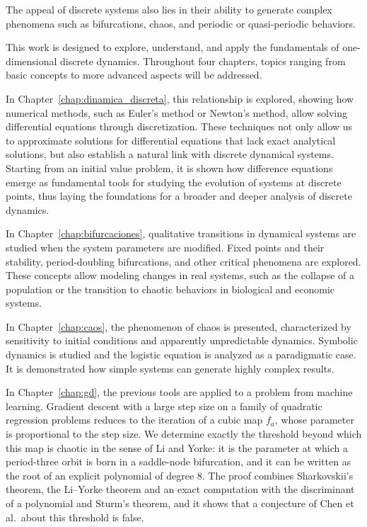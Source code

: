 \documentclass[12pt,a4paper]{report}
\theoremstyle{definition}
\begin{document}
The appeal of discrete systems also lies in their ability to generate complex phenomena such as bifurcations, chaos, and periodic or quasi-periodic behaviors.

This work is designed to explore, understand, and apply the fundamentals of one-dimensional discrete dynamics. Throughout four chapters, topics ranging from basic concepts to more advanced aspects will be addressed.

In Chapter~\ref{chap:dinamica_discreta}, this relationship is explored, showing how numerical methods, such as Euler's method or Newton's method, allow solving differential equations through discretization. These techniques not only allow us to approximate solutions for differential equations that lack exact analytical solutions, but also establish a natural link with discrete dynamical systems. Starting from an initial value problem, it is shown how difference equations emerge as fundamental tools for studying the evolution of systems at discrete points, thus laying the foundations for a broader and deeper analysis of discrete dynamics.

In Chapter~\ref{chap:bifurcaciones}, qualitative transitions in dynamical systems are studied when the system parameters are modified. Fixed points and their stability, period-doubling bifurcations, and other critical phenomena are explored. These concepts allow modeling changes in real systems, such as the collapse of a population or the transition to chaotic behaviors in biological and economic systems.

In Chapter~\ref{chap:caos}, the phenomenon of chaos is presented, characterized by sensitivity to initial conditions and apparently unpredictable dynamics. Symbolic dynamics is studied and the logistic equation is analyzed as a paradigmatic case. It is demonstrated how simple systems can generate highly complex results.

In Chapter~\ref{chap:gd}, the previous tools are applied to a problem from machine learning. Gradient descent with a large step size on a family of quadratic regression problems reduces to the iteration of a cubic map $f_a$, whose parameter is proportional to the step size. We determine exactly the threshold beyond which this map is chaotic in the sense of Li and Yorke: it is the parameter at which a period-three orbit is born in a saddle-node bifurcation, and it can be written as the root of an explicit polynomial of degree $8$. The proof combines Sharkovskii's theorem, the Li--Yorke theorem and an exact computation with the discriminant of a polynomial and Sturm's theorem, and it shows that a conjecture of Chen et al.\ about this threshold is false.
\end{document}
